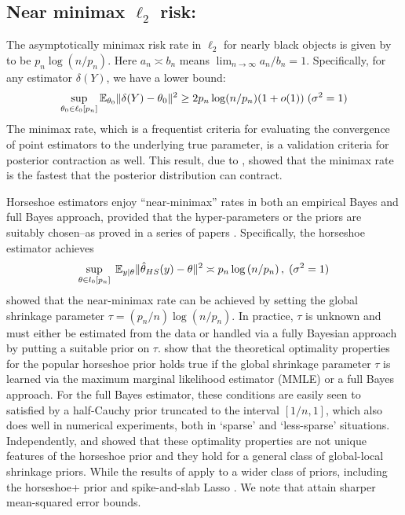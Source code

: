 \documentclass[11pt]{article}
\begin{document}
\subsection{Near minimax $\ell_2$ risk:}

The asymptotically minimax risk rate in $\ell_2$ for nearly black objects is
given by \citet{donoho1992maximum} to be $p_n \log \left ( n / p_n \right )$.
Here $a_n \asymp b_n$ means $\lim_{n\to\infty} a_n/b_n=1$. Specifically, for
any estimator $\delta(Y)$, we have a lower bound: 
\begin{equation}
  \sup_{\theta_0 \in \ell_0[p_n]} \mathbb E_{\theta_0} \lVert\delta(Y) - \theta_0\rVert^2
  \ge 2 p_n \log(n/p_n)(1+o(1))\; (\sigma^2 =1)
\end{equation}
The minimax rate, which is a frequentist criteria for evaluating the
convergence of point estimators to the underlying true parameter, is a
validation criteria for posterior contraction as well. This result, due to
\citet{ghosal2000}, showed that the minimax rate is the fastest that the
posterior distribution can contract. 

Horseshoe estimators enjoy ``near-minimax'' rates in both an empirical Bayes and
full Bayes approach, provided that the hyper-parameters or the priors are
suitably chosen--as proved in a series of papers
\citep{van2014horseshoe,van2015conditions,van2016many,van2017adaptive}.
Specifically, the horseshoe estimator achieves
\begin{equation}
  \sup_{ \theta \in l_0[p_n] } \; \mathbb{E}_{ y | \theta } \lVert {\hat{\theta}}_{HS}{} (y) -
  \theta \rVert^2 \asymp p_n \log \left ( n / p_n \right ), \; (\sigma^2 =1)
  \label{eq:minimax}
\end{equation}
\citet{van2014horseshoe} showed that the near-minimax rate can be achieved by
setting the global shrinkage parameter $\tau = (p_n/n) \log(n/p_n)$. In
practice, $\tau$ is unknown and must either be estimated from the data or
handled via a fully Bayesian approach by putting a suitable prior on $\tau$.
\cite{van2017adaptive} show that the theoretical optimality properties for the
popular horseshoe prior holds true if the global shrinkage parameter $\tau$ is
learned via the maximum marginal likelihood estimator (MMLE) or a full Bayes
approach. For the full Bayes estimator, these conditions are easily seen to
satisfied by a half-Cauchy prior truncated to the interval $[1/n,1]$, which
also does well in numerical experiments, both in `sparse' and `less-sparse'
situations. Independently, \citet{van2015conditions} and
\citet{ghosh2016asymptotic} showed that these optimality properties are not
unique features of the horseshoe prior and they hold for a general class of
global-local shrinkage priors. While the results of \cite{van2015conditions}
apply to a wider class of priors, including the horseshoe+ prior
\citep{bhadra2015horseshoe+} and spike-and-slab Lasso
\citep{rovckova2016spike}.  We note that \citet{ghosh2016asymptotic} attain
sharper mean-squared error bounds. 
\end{document}
